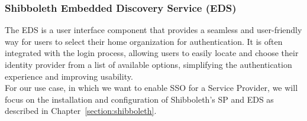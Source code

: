 \subsubsection*{Shibboleth Embedded Discovery Service (EDS)}
The EDS is a user interface component that provides a seamless and user-friendly
way for users to select their home organization for authentication. It is often
integrated with the login process, allowing users to easily locate and choose
their identity provider from a list of available options, simplifying the
authentication experience and improving usability. \\

\noindent For our use case, in which we want to enable SSO for a Service
Provider, we will focus on the installation and configuration of Shibboleth's SP
and EDS as described in Chapter~\ref{section:shibboleth}.



